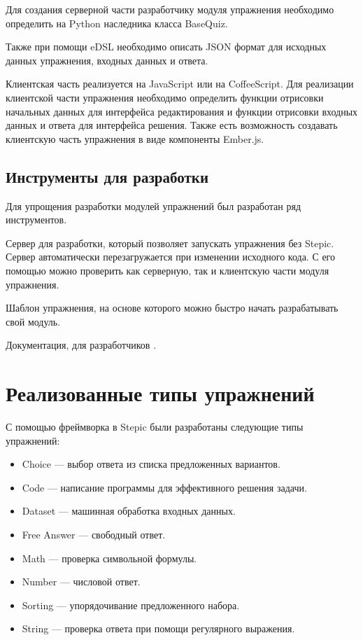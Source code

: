 \documentclass{matmex-diploma-custom}
\begin{document}
Для создания серверной части разработчику модуля упражнения необходимо
определить на Python наследника класса BaseQuiz.

Также при помощи eDSL необходимо описать JSON формат для исходных
данных упражнения, входных данных и ответа.

Клиентская часть реализуется на JavaScript или на CoffeeScript. Для
реализации клиентской части упражнения необходимо определить функции
отрисовки начальных данных для интерфейса редактирования и функции
отрисовки входных данных и ответа для интерфейса решения. Также есть
возможность создавать клиентскую часть упражнения в виде компоненты Ember.js.

\subsection{Инструменты для разработки}
Для упрощения разработки модулей упражнений был разработан ряд
инструментов.

Сервер для разработки, который позволяет запускать упражнения без
Stepic. Сервер автоматически перезагружается при изменении исходного
кода. С его помощью можно проверить как серверную, так и клиентскую
части модуля упражнения.

Шаблон упражнения, на основе которого можно быстро начать
разрабатывать свой модуль.

Документация, для разработчиков \cite{plugins:doc}.

\section{Реализованные типы упражнений}

С помощью фреймворка в Stepic были разработаны следующие типы упражнений:
\begin{itemize}
\item Choice --- выбор ответа из списка предложенных вариантов.
\item Code --- написание программы для эффективного решения задачи.
\item Dataset --- машинная обработка входных данных.
\item Free Answer --- свободный ответ.
\item Math --- проверка символьной формулы.
\item Number --- числовой ответ.
\item Sorting --- упорядочивание предложенного набора.
\item String --- проверка ответа при помощи регулярного выражения.
\end{itemize}
\end{document}
